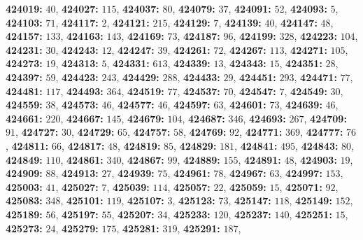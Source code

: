 \textsf{\bfseries 424019:} $40$, \textsf{\bfseries 424027:} $115$, \textsf{\bfseries 424037:} $80$, \textsf{\bfseries 424079:} $37$, \textsf{\bfseries 424091:} $52$, \textsf{\bfseries 424093:} $5$, \textsf{\bfseries 424103:} $71$, \textsf{\bfseries 424117:} $2$, \textsf{\bfseries 424121:} $215$, \textsf{\bfseries 424129:} $7$, \textsf{\bfseries 424139:} $40$, \textsf{\bfseries 424147:} $48$, \textsf{\bfseries 424157:} $133$, \textsf{\bfseries 424163:} $143$, \textsf{\bfseries 424169:} $73$, \textsf{\bfseries 424187:} $96$, \textsf{\bfseries 424199:} $328$, \textsf{\bfseries 424223:} $104$, \textsf{\bfseries 424231:} $30$, \textsf{\bfseries 424243:} $12$, \textsf{\bfseries 424247:} $39$, \textsf{\bfseries 424261:} $72$, \textsf{\bfseries 424267:} $113$, \textsf{\bfseries 424271:} $105$, \textsf{\bfseries 424273:} $19$, \textsf{\bfseries 424313:} $5$, \textsf{\bfseries 424331:} $613$, \textsf{\bfseries 424339:} $13$, \textsf{\bfseries 424343:} $15$, \textsf{\bfseries 424351:} $28$, \textsf{\bfseries 424397:} $59$, \textsf{\bfseries 424423:} $243$, \textsf{\bfseries 424429:} $288$, \textsf{\bfseries 424433:} $29$, \textsf{\bfseries 424451:} $293$, \textsf{\bfseries 424471:} $77$, \textsf{\bfseries 424481:} $117$, \textsf{\bfseries 424493:} $364$, \textsf{\bfseries 424519:} $77$, \textsf{\bfseries 424537:} $70$, \textsf{\bfseries 424547:} $7$, \textsf{\bfseries 424549:} $30$, \textsf{\bfseries 424559:} $38$, \textsf{\bfseries 424573:} $46$, \textsf{\bfseries 424577:} $46$, \textsf{\bfseries 424597:} $63$, \textsf{\bfseries 424601:} $73$, \textsf{\bfseries 424639:} $46$, \textsf{\bfseries 424661:} $220$, \textsf{\bfseries 424667:} $145$, \textsf{\bfseries 424679:} $104$, \textsf{\bfseries 424687:} $346$, \textsf{\bfseries 424693:} $267$, \textsf{\bfseries 424709:} $91$, \textsf{\bfseries 424727:} $30$, \textsf{\bfseries 424729:} $65$, \textsf{\bfseries 424757:} $58$, \textsf{\bfseries 424769:} $92$, \textsf{\bfseries 424771:} $369$, \textsf{\bfseries 424777:} $76$, \textsf{\bfseries 424811:} $66$, \textsf{\bfseries 424817:} $48$, \textsf{\bfseries 424819:} $85$, \textsf{\bfseries 424829:} $181$, \textsf{\bfseries 424841:} $495$, \textsf{\bfseries 424843:} $80$, \textsf{\bfseries 424849:} $110$, \textsf{\bfseries 424861:} $340$, \textsf{\bfseries 424867:} $99$, \textsf{\bfseries 424889:} $155$, \textsf{\bfseries 424891:} $48$, \textsf{\bfseries 424903:} $19$, \textsf{\bfseries 424909:} $88$, \textsf{\bfseries 424913:} $27$, \textsf{\bfseries 424939:} $75$, \textsf{\bfseries 424961:} $78$, \textsf{\bfseries 424967:} $63$, \textsf{\bfseries 424997:} $153$, \textsf{\bfseries 425003:} $41$, \textsf{\bfseries 425027:} $7$, \textsf{\bfseries 425039:} $114$, \textsf{\bfseries 425057:} $22$, \textsf{\bfseries 425059:} $15$, \textsf{\bfseries 425071:} $92$, \textsf{\bfseries 425083:} $348$, \textsf{\bfseries 425101:} $119$, \textsf{\bfseries 425107:} $3$, \textsf{\bfseries 425123:} $73$, \textsf{\bfseries 425147:} $118$, \textsf{\bfseries 425149:} $152$, \textsf{\bfseries 425189:} $56$, \textsf{\bfseries 425197:} $55$, \textsf{\bfseries 425207:} $34$, \textsf{\bfseries 425233:} $120$, \textsf{\bfseries 425237:} $140$, \textsf{\bfseries 425251:} $15$, \textsf{\bfseries 425273:} $24$, \textsf{\bfseries 425279:} $175$, \textsf{\bfseries 425281:} $319$, \textsf{\bfseries 425291:} $187$, 
